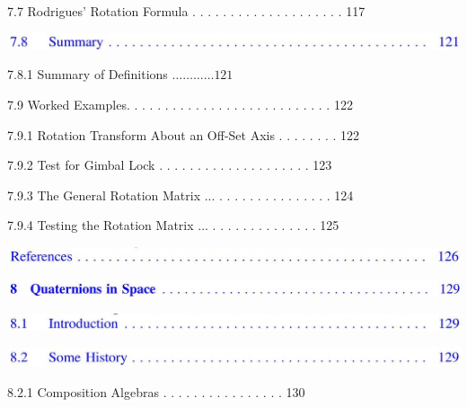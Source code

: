 \documentclass[10pt]{article}
\begin{document}
7.7 Rodrigues' Rotation Formula . . . . . . . . . . . . . . . . . . . . 117

\begin{center}
\includegraphics[max width=\textwidth]{2023_04_20_41f1ceac5a31dc7d1b59g-012(1)}
\end{center}

7.8.1 Summary of Definitions $\ldots \ldots \ldots \ldots 121$

7.9 Worked Examples. . . . . . . . . . . . . . . . . . . . . . . . . . . 122

7.9.1 Rotation Transform About an Off-Set Axis . . . . . . . . 122

7.9.2 Test for Gimbal Lock . . . . . . . . . . . . . . . . . . . . 123

7.9.3 The General Rotation Matrix ... . . . . . . . . . . . . . . . 124

7.9.4 Testing the Rotation Matrix ... . . . . . . . . . . . . . . 125

\begin{center}
\includegraphics[max width=\textwidth]{2023_04_20_41f1ceac5a31dc7d1b59g-012(5)}
\end{center}

\begin{center}
\includegraphics[max width=\textwidth]{2023_04_20_41f1ceac5a31dc7d1b59g-013(12)}
\end{center}

\begin{center}
\includegraphics[max width=\textwidth]{2023_04_20_41f1ceac5a31dc7d1b59g-013(1)}
\end{center}

\begin{center}
\includegraphics[max width=\textwidth]{2023_04_20_41f1ceac5a31dc7d1b59g-013}
\end{center}

8.2.1 Composition Algebras . . . . . . . . . . . . . . . . 130
\end{document}
